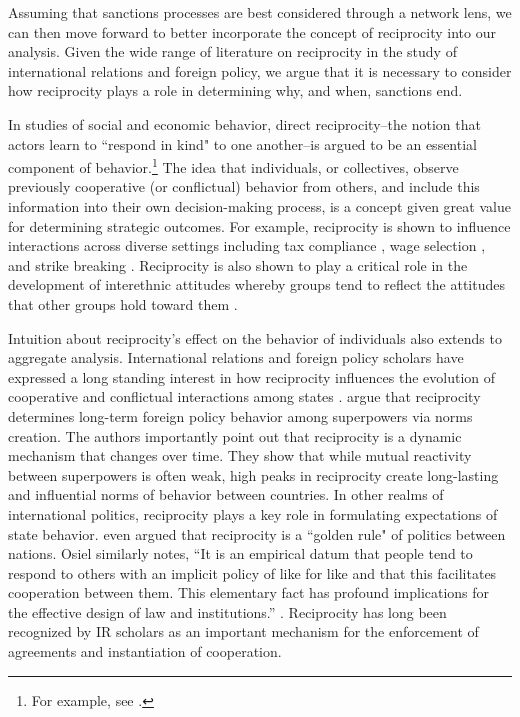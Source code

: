 Assuming that sanctions processes are best considered through a network lens, we can then move forward to better incorporate the concept of reciprocity into our analysis. Given the wide range of literature on reciprocity in the study of international relations and foreign policy, we argue that it is necessary to consider how reciprocity plays a role in determining why, and when, sanctions end.

In studies of social and economic behavior, direct reciprocity--the notion that actors learn to ``respond in kind" to one another--is argued to be an essential component of behavior.\footnote{For example, see \cite{bolton:1998, charness:2002, charness:2004, cox:2007, cox:2004}.} The idea that individuals, or collectives, observe previously cooperative (or conflictual) behavior from others, and include this information into their own decision-making process, is a concept given great value for determining strategic outcomes. For example, reciprocity is shown to influence interactions across diverse settings including tax compliance \citep{smith:1990}, wage selection \citep{campbell:1997}, and strike breaking \citep{brett:1998}. Reciprocity is also shown to play a critical role in the development of interethnic attitudes whereby groups tend to reflect the attitudes that other groups hold toward them \citep{berry:1979}. 

Intuition about reciprocity's effect on the behavior of individuals also extends to aggregate analysis. International relations and foreign policy scholars have expressed a long standing interest in how reciprocity influences the evolution of cooperative and conflictual interactions among states \citep{keohane1989reciprocity, richardson1960}. \cite{rajmaira:1990} argue that reciprocity determines long-term foreign policy behavior among superpowers via norms creation. The authors importantly point out that reciprocity is a dynamic mechanism that changes over time. They show that while mutual reactivity between superpowers is often weak, high peaks in reciprocity create long-lasting and influential norms of behavior between countries. In other realms of international politics, reciprocity plays a key role in formulating expectations of state behavior. \cite{ward1981} even argued that reciprocity is a ``golden rule" of politics between nations.  Osiel similarly notes, ``It is an empirical datum that people tend to respond to others with an implicit policy of like for like and that this facilitates cooperation between them. This elementary fact has profound implications for the effective design of law and institutions.'' \cite[p. 19]{osiel:2009}. Reciprocity has long been recognized by IR scholars as an important mechanism for the enforcement of agreements and instantiation of cooperation. 


